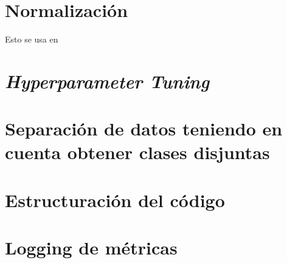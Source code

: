 \section{Normalización}

Esto se usa en \cite{informatica:facenet}

\section{\textit{Hyperparameter Tuning}} \label{isec:hp_tuning}

\section{Separación de datos teniendo en cuenta obtener clases disjuntas}

\section{Estructuración del código}

\section{Logging de métricas} \label{isec:loggin_metricas}


